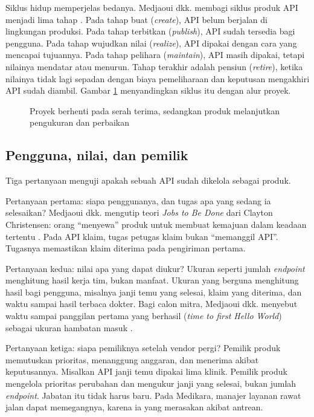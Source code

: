 Siklus hidup memperjelas bedanya. Medjaoui dkk. membagi siklus produk API menjadi lima tahap
\cite{medjaoui2021continuous}. Pada tahap buat (\textit{create}), API belum berjalan di lingkungan
produksi. Pada tahap terbitkan (\textit{publish}), API sudah tersedia bagi pengguna. Pada tahap
wujudkan nilai (\textit{realize}), API dipakai dengan cara yang mencapai tujuannya. Pada tahap pelihara
(\textit{maintain}), API masih dipakai, tetapi nilainya mendatar atau menurun. Tahap terakhir adalah
pensiun (\textit{retire}), ketika nilainya tidak lagi sepadan dengan biaya pemeliharaan dan keputusan
mengakhiri API sudah diambil. Gambar \ref{fig:ch04-proyek-produk} menyandingkan siklus itu dengan alur
proyek.

\begin{figure}[!htb]
  \centering
  
  \caption{Proyek berhenti pada serah terima, sedangkan produk melanjutkan pengukuran dan perbaikan}
  \label{fig:ch04-proyek-produk}
\end{figure}

\subsection*{Pengguna, nilai, dan pemilik}

Tiga pertanyaan menguji apakah sebuah API sudah dikelola sebagai produk.

Pertanyaan pertama: siapa penggunanya, dan tugas apa yang sedang ia selesaikan? Medjaoui dkk. mengutip
teori \textit{Jobs to Be Done} dari Clayton Christensen: orang ``menyewa'' produk untuk membuat kemajuan
dalam keadaan tertentu \cite{medjaoui2021continuous}. Pada API klaim, tugas petugas klaim bukan
``memanggil API''. Tugasnya memastikan klaim diterima pada pengiriman pertama.

Pertanyaan kedua: nilai apa yang dapat diukur? Ukuran seperti jumlah \textit{endpoint} menghitung hasil
kerja tim, bukan manfaat. Ukuran yang berguna menghitung hasil bagi pengguna, misalnya janji temu yang
selesai, klaim yang diterima, dan waktu sampai hasil terbaca dokter. Bagi calon mitra, Medjaoui dkk.
menyebut waktu sampai panggilan pertama yang berhasil (\textit{time to first Hello World}) sebagai
ukuran hambatan masuk \cite{medjaoui2021continuous}.

Pertanyaan ketiga: siapa pemiliknya setelah vendor pergi? Pemilik produk memutuskan prioritas,
menanggung anggaran, dan menerima akibat keputusannya. Misalkan API janji temu dipakai lima klinik.
Pemilik produk mengelola prioritas perubahan dan mengukur janji yang selesai, bukan jumlah
\textit{endpoint}. Jabatan itu tidak harus baru. Pada Medikara, manajer layanan rawat jalan dapat
memegangnya, karena ia yang merasakan akibat antrean.

